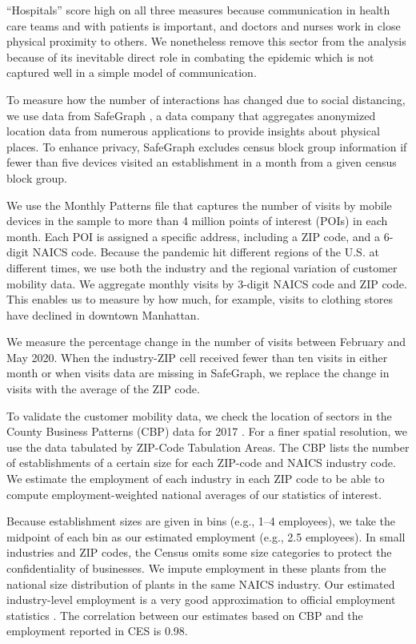 ``Hospitals'' score high on all three measures because communication in health care teams and with patients is important, and doctors and nurses work in close physical proximity to others. We nonetheless remove this sector from the analysis because of its inevitable direct role in combating the epidemic which is not captured well in a simple model of communication.

To measure how the number of interactions has changed due to social distancing, we use data from SafeGraph \cite{SafeGraph2020-gn}, a data company that aggregates anonymized location data from numerous applications to provide insights about physical places. To enhance privacy, SafeGraph excludes census block group information if fewer than five devices visited an establishment in a month from a given census block group.

We use the Monthly Patterns file that captures the number of visits by mobile devices in the sample to more than 4 million points of interest (POIs) in each month. Each POI is assigned a specific address, including a ZIP code, and a 6-digit NAICS code. Because the pandemic hit different regions of the U.S. at different times, we use both the industry and the regional variation of customer mobility data. We aggregate monthly visits by 3-digit NAICS code and ZIP code. This enables us to measure by how much, for example, visits to clothing stores have declined in downtown Manhattan.

We measure the percentage change in the number of visits between February and May 2020. When the industry-ZIP cell received fewer than ten visits in either month or when visits data are missing in SafeGraph, we replace the change in visits with the average of the ZIP code.

To validate the customer mobility data, we check the location of sectors in the County Business Patterns (CBP) data for 2017 \cite{CBP}. For a finer spatial resolution, we use the data tabulated by ZIP-Code Tabulation Areas. The CBP lists the number of establishments of a certain size for each ZIP-code and NAICS industry code. We estimate the employment of each industry in each ZIP code to be able to compute employment-weighted national averages of our statistics of interest.

Because establishment sizes are given in bins (e.g., 1--4 employees), we take the midpoint of each bin as our estimated employment (e.g., 2.5 employees). In small industries and ZIP codes, the Census omits some size categories to protect the confidentiality of businesses. We impute employment in these plants from the national size distribution of plants in the same NAICS industry. Our estimated industry-level employment is a very good approximation to official employment statistics \cite{CES}. The correlation between our estimates based on CBP and the employment reported in CES is 0.98.

